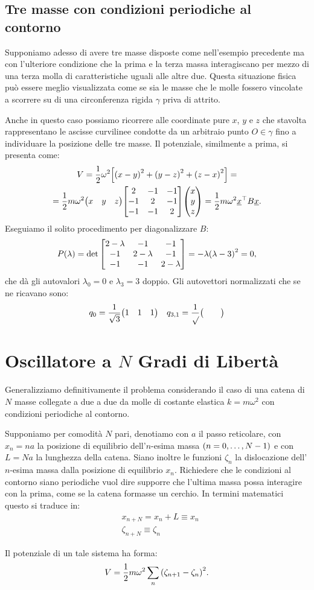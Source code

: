     \subsection{Tre masse con condizioni periodiche al contorno}
        Supponiamo adesso di avere tre masse disposte come nell'esempio precedente ma con l'ulteriore condizione che la prima e la terza massa interagiscano per mezzo di una terza molla di caratteristiche uguali alle altre due. Questa situazione fisica pu\`o essere meglio visualizzata come se sia le masse che le molle fossero vincolate a scorrere su di una circonferenza rigida $\gamma$ priva di attrito. \par Anche in questo caso possiamo ricorrere alle coordinate pure $x$, $y$ e $z$ che stavolta rappresentano le ascisse curvilinee condotte da un arbitraio punto $O\in\gamma$ fino a individuare la posizione delle tre masse. Il potenziale, similmente a prima, si presenta come: 
        \begin{multline*}
            V=\frac{1}{2}\omega^2\qty[\qty(x-y)^2+\qty(y-z)^2+\qty(z-x)^2]=\\=\frac{1}{2}m\omega^2\mqty(x & y & z)\mqty[\dmat[-1]{2,2,2}]\mqty(x \\ y \\ z)=\frac{1}{2}m\omega^2\underline{x}^\top B\underline{x}.
        \end{multline*}
        Eseguiamo il solito procedimento per diagonalizzare $B$: $$P\qty(\lambda)=\det\mqty[\dmat[-1]{2-\lambda,2-\lambda,2-\lambda}]=-\lambda\qty(\lambda-3)^2=0,$$ che d\`a gli autovalori $\lambda_0=0$ e $\lambda_3=3$ doppio. Gli autovettori normalizzati che se ne ricavano sono: $$q_0=\frac{1}{\sqrt{3}}\mqty(1 & 1 & 1)\quad q_{3,1}=\frac{1}{\sqrt{}}\mqty( & & )$$
\section{Oscillatore a $N$ Gradi di Libert\`a}
    Generalizziamo definitivamente il problema considerando il caso di una catena di $N$ masse collegate a due a due da molle di costante elastica $k=m\omega^2$ con condizioni periodiche al contorno. \par Supponiamo per comodit\`a $N$ pari, denotiamo con $a$ il passo reticolare, con $x_n=na$ la posizione di equilibrio dell'$n$-esima massa $\qty(n=0,\dots,N-1)$ e con $L=Na$ la lunghezza della catena. Siano inoltre le funzioni $\zeta_n$ la dislocazione dell'$n$-esima massa dalla posizione di equilibrio $x_n$. Richiedere che le condizioni al contorno siano periodiche vuol dire supporre che l'ultima massa possa interagire con la prima, come se la catena formasse un cerchio. In termini matematici questo si traduce in:
    \begin{align}
        &x_{n+N}=x_n+L\equiv x_n \label{eq:period:1}\\
        &\zeta_{n+N}\equiv \zeta_n \label{eq:period:2}
    \end{align} \par
    Il potenziale di un tale sistema ha forma:
    \begin{equation}
        V=\frac{1}{2}m\omega^2\sum_n\qty(\zeta_{n+1}-\zeta_n)^2.
        \label{eq:potenziale:2}
    \end{equation}
